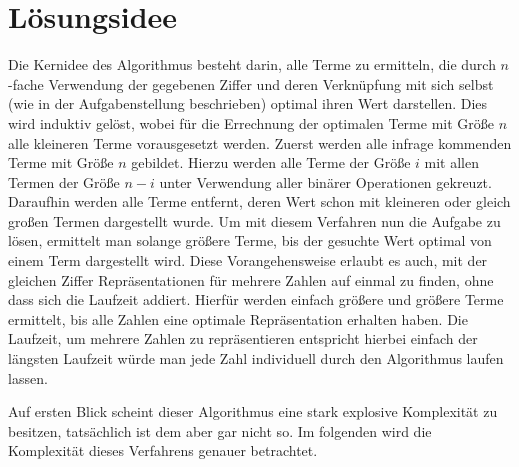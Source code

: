\documentclass{article}
\theoremstyle{nonumberplain}
\begin{document}

\section{Lösungsidee}

Die Kernidee des Algorithmus besteht darin, alle Terme zu ermitteln, die durch \(n\)-fache Verwendung der gegebenen Ziffer und deren Verknüpfung mit sich selbst (wie in der Aufgabenstellung beschrieben) optimal ihren Wert darstellen.
Dies wird induktiv gelöst, wobei für die Errechnung der optimalen Terme mit Größe \(n\) alle kleineren Terme vorausgesetzt werden.
Zuerst werden alle infrage kommenden Terme mit Größe \(n\) gebildet. Hierzu werden alle Terme der Größe \(i\) mit allen Termen der Größe \(n-i\) unter Verwendung aller binärer Operationen gekreuzt.
Daraufhin werden alle Terme entfernt, deren Wert schon mit kleineren oder gleich großen Termen dargestellt wurde.
Um mit diesem Verfahren nun die Aufgabe zu lösen, ermittelt man solange größere Terme, bis der gesuchte Wert optimal von einem Term dargestellt wird.
Diese Vorangehensweise erlaubt es auch, mit der gleichen Ziffer Repräsentationen für mehrere Zahlen auf einmal zu finden, ohne dass sich die Laufzeit addiert.
Hierfür werden einfach größere und größere Terme ermittelt, bis alle Zahlen eine optimale Repräsentation erhalten haben.
Die Laufzeit, um mehrere Zahlen zu repräsentieren entspricht hierbei einfach der längsten Laufzeit würde man jede Zahl individuell durch den Algorithmus laufen lassen.

Auf ersten Blick scheint dieser Algorithmus eine stark explosive Komplexität zu besitzen, tatsächlich ist dem aber gar nicht so.
Im folgenden wird die Komplexität dieses Verfahrens genauer betrachtet.

\newcommand{\fad}{\forall d, B:\ }
\newcommand{\measure}[1]{\Phi_{d}^{B}(#1)}
\end{document}
